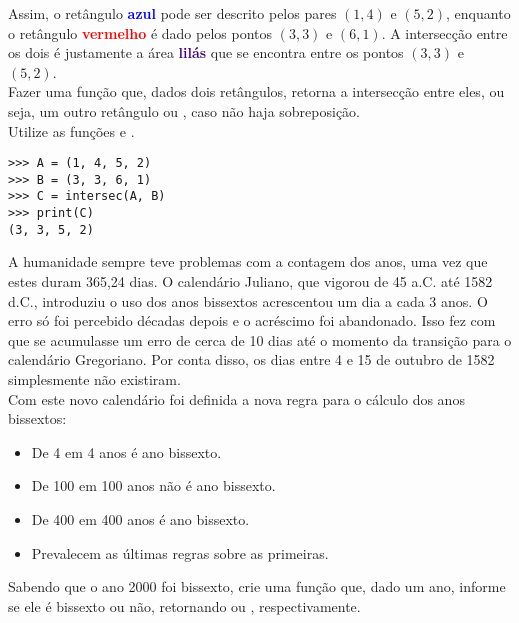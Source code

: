 \documentclass[12pt]{article}
\begin{document}
	
	
	Assim, o retângulo \textcolor{blue}{\textbf{azul}} pode ser descrito pelos pares $(1, 4)$ e $(5, 2)$, enquanto o retângulo \textcolor{red}{\textbf{vermelho}} é dado pelos pontos $(3, 3)$ e $(6, 1)$. A intersecção entre os dois é justamente a área \textcolor{indigo}{\textbf{lilás}} que se encontra entre os pontos $(3, 3)$ e $(5, 2)$. \\
	
	\quest Fazer uma função que, dados dois retângulos, retorna a intersecção entre eles, ou seja, um outro retângulo ou , caso não haja sobreposição.\\
	
	\clue Utilize as funções  e .\\
	
	\example
	\begin{lstlisting}
>>> A = (1, 4, 5, 2)
>>> B = (3, 3, 6, 1)
>>> C = intersec(A, B)
>>> print(C)
(3, 3, 5, 2)
	\end{lstlisting}
	
	\pagebreak
	
	
	A humanidade sempre teve problemas com a contagem dos anos, uma vez que estes duram 365,24 dias. O calendário Juliano, que vigorou de 45 a.C. até 1582 d.C., introduziu o uso dos anos bissextos acrescentou um dia a cada 3 anos. O erro só foi percebido décadas depois e o acréscimo foi abandonado. Isso fez com que se acumulasse um erro de cerca de 10 dias até o momento da transição para o calendário Gregoriano. Por conta disso, os dias entre 4 e 15 de outubro de 1582 simplesmente não existiram.\\
	
	Com este novo calendário foi definida a nova regra para o cálculo dos anos bissextos:
	
	\begin{itemize}
		\item De 4 em 4 anos é ano bissexto.
		\item De 100 em 100 anos não é ano bissexto.
		\item De 400 em 400 anos é ano bissexto.
		\item Prevalecem as últimas regras sobre as primeiras.
	\end{itemize}
	
	\quest Sabendo que o ano 2000 foi bissexto, crie uma função que, dado um ano, informe se ele é bissexto ou não, retornando  ou , respectivamente.\\
	
\end{document}
